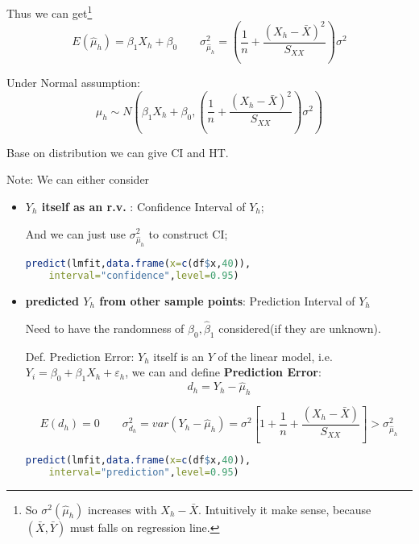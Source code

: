     Thus we can get\footnote{So $ \sigma ^2(\hat{\mu }_h) $ increases with $ X_h-\bar{X} $. Intuitively it make sense, because $ (\bar{X},\bar{Y})$ must falls on regression line.}
    \begin{equation}
        E(\hat{\mu}_h)= \beta _1X_h+\beta _0\qquad \sigma ^2_{\hat{\mu}_h}=\left( \dfrac{1}{n}+\dfrac{(X_h-\bar{X})^2}{S_{XX}} \right)\sigma^2
    \end{equation}
    
    Under Normal assumption:
    \begin{equation}
        \hat{\mu}_h\sim N(\beta _1X_h+\beta _0,\left( \dfrac{1}{n}+\dfrac{(X_h-\bar{X})^2}{S_{XX}} \right)\sigma^2) 
    \end{equation}
    
    Base on distribution we can give CI and HT.

    Note: We can either consider 
    \begin{itemize}[topsep=2pt,itemsep=2pt]
        \item \textbf{$ Y_h $ itself as an r.v. }: Confidence Interval of $ Y_h $;
        
        And we can just use $  \sigma ^2_{\hat{\mu}_h} $ to construct CI;

        \begin{rcode}
\begin{lstlisting}[language=R]
predict(lmfit,data.frame(x=c(df$x,40)),
    interval="confidence",level=0.95)
\end{lstlisting}
        \end{rcode}
        \item \textbf{predicted $ Y_h $ from other sample points}: Prediction Interval of $ Y_h $
        
        Need to  have the randomness of $ \hat{\beta }_0,\hat{\beta }_1 $ considered(if they are unknown).

        Def. Prediction Error: $ Y_h $ itself is an $ Y $ of the linear model, i.e. $ Y_i=\beta_0+\beta_1X_h+\varepsilon _h $, we can  and define \textbf{Prediction Error}: 
        \begin{equation}
            d_h=Y_h-\hat{\mu}_h 
        \end{equation}
    
        
        \begin{equation}
            E(d_h)=0\qquad \sigma^2_{d_h}=var(Y_h-\hat{\mu }_h)=\sigma^2\left[ 1+\dfrac{1}{n}+\dfrac{(X_h-\bar{X})}{S_{XX}} \right] > \sigma ^2_{\hat{\mu}_h}
        \end{equation}
\begin{rcode}
\begin{lstlisting}[language=R]
predict(lmfit,data.frame(x=c(df$x,40)),
    interval="prediction",level=0.95)
\end{lstlisting}
\end{rcode}
    
    \end{itemize}
    
